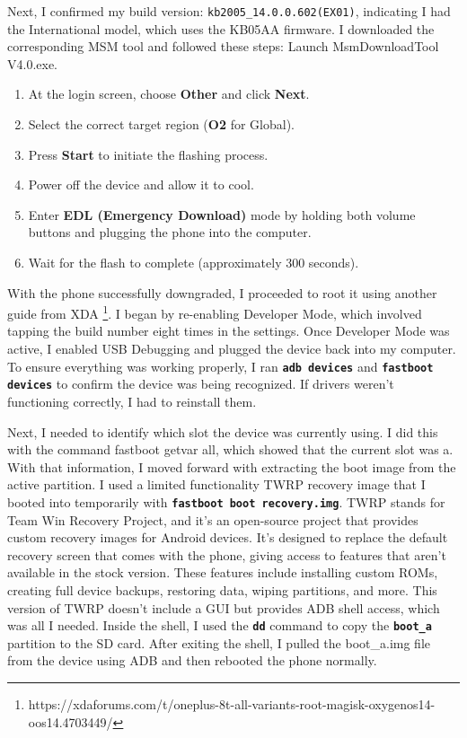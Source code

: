 Next, I confirmed my build version: \texttt{kb2005\_14.0.0.602(EX01)}, indicating I 
had the International model, which uses the KB05AA firmware. I downloaded the corresponding MSM tool and followed these steps:
Launch MsmDownloadTool V4.0.exe.


\begin{enumerate}
    \item At the login screen, choose \textbf{Other} and click \textbf{Next}.
    \item Select the correct target region (\textbf{O2} for Global).
    \item Press \textbf{Start} to initiate the flashing process.
    \item Power off the device and allow it to cool.
    \item Enter \textbf{EDL (Emergency Download)} mode by holding both volume buttons and plugging the phone into the computer.
    \item Wait for the flash to complete (approximately 300 seconds).
\end{enumerate}

With the phone successfully downgraded, I proceeded to root it using another guide from XDA \footnote{https://xdaforums.com/t/oneplus-8t-all-variants-root-magisk-oxygenos14-oos14.4703449/}. I began by re-enabling Developer Mode, which involved tapping the build number eight times in the settings. Once Developer Mode was active, I enabled USB Debugging and plugged the device back into my computer. To ensure everything was working properly, I ran \textbf{\texttt{adb devices}} and \textbf{\texttt{fastboot devices}} to confirm the device was being recognized. If drivers weren’t functioning correctly, I had to reinstall them.

Next, I needed to identify which slot the device was currently using. I did this with the command fastboot getvar all, which showed that the current slot was a. With that information, I moved forward with extracting the boot image from the active partition. I used a limited functionality TWRP recovery image that I booted into temporarily with \textbf{\texttt{fastboot boot recovery.img}}. TWRP stands for Team Win Recovery Project, and it’s an open-source project that provides custom recovery images for Android devices. It’s designed to replace the default recovery screen that comes with the phone, giving access to features that aren’t available in the stock version. These features include installing custom ROMs, creating full device backups, restoring data, wiping partitions, and more. This version of TWRP doesn’t include a GUI but provides ADB shell access, which was all I needed. Inside the shell, I used the \textbf{\texttt{dd}} command to copy the \textbf{\texttt{boot\_a}} partition to the SD card. After exiting the shell, I pulled the boot\_a.img file from the device using ADB and then rebooted the phone normally.

